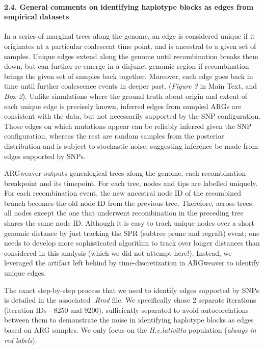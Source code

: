 \documentclass[
]{article}
\begin{document}
\hypertarget{general-comments-on-identifying-haplotype-blocks-as-edges-from-empirical-datasets}{%
\paragraph{\texorpdfstring{2.4. General comments on identifying
haplotype blocks as edges from empirical datasets\\
}{2.4. General comments on identifying haplotype blocks as edges from empirical datasets }}\label{general-comments-on-identifying-haplotype-blocks-as-edges-from-empirical-datasets}}

\hfill\break
In a series of marginal trees along the genome, an edge is considered
unique if it originates at a particular coalescent time point, and is
ancestral to a given set of samples. Unique edges extend along the
genome until recombination breaks them down, but can further re-emerge
in a disjunct genomic region if recombination brings the given set of
samples back together. Moreover, each edge goes back in time until
further coalescence events in deeper past. (\emph{Figure 3} in Main
Text, and \emph{Box 2}). Unlike simulations where the ground truth about
origin and extent of each unique edge is precisely known, inferred edges
from sampled ARGs are consistent with the data, but not necessarily
supported by the SNP configuration. Those edges on which mutations
appear can be reliably inferred given the SNP configuration, whereas the
rest are random samples from the posterior distribution and is subject
to stochastic noise, suggesting inference be made from edges supported
by SNPs.

ARGweaver outputs genealogical trees along the genome, each
recombination breakpoint and its timepoint. For each tree, nodes and
tips are labelled uniquely. For each recombination event, the new
ancestral node ID of the recombined branch becomes the old node ID from
the previous tree. Therefore, across trees, all nodes except the one
that underwent recombination in the preceding tree shares the same node
ID. Although it is easy to track unique nodes over a short genomic
distance by just tracking the SPR (subtree prune and regraft) event; one
needs to develop more sophisticated algorithm to track over longer
distances than considered in this analysis (which we did not attempt
here!). Instead, we leveraged the artifact left behind by
time-discretization in ARGweaver to identify unique edges.

The exact step-by-step process that we used to identify edges
supported by SNPs is detailed in the associated \emph{.Rmd} file. We
specifically chose 2 separate iterations (iteration IDs - 8250 and
9200), sufficiently separated to avoid autocorelations between them to
demonstrate the noise in identifying haplotype blocks as edges based on
ARG samples. We only focus on the \emph{H.e.lativitta} population
(\emph{always in red labels}).
\end{document}
